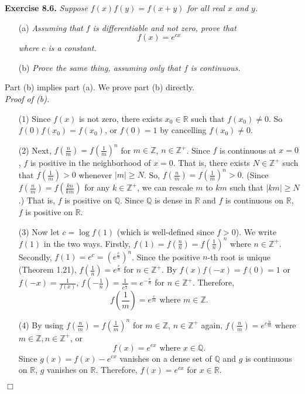 \documentclass{article}
\begin{document}



\textbf{Exercise 8.6.}
\emph{Suppose $f(x)f(y) = f(x + y)$ for all real $x$ and $y$.}
\begin{enumerate}
\item[(a)]
\emph{Assuming that $f$ is differentiable and not zero, prove that
$$f(x) = e^{cx}$$
where $c$ is a constant.}
\item[(b)]
\emph{Prove the same thing, assuming only that $f$ is continuous.} \\
\end{enumerate}

Part (b) implies part (a). We prove part (b) directly. \\

\emph{Proof of (b).}
\begin{enumerate}
\item[(1)]
Since $f(x)$ is not zero, there exists $x_0 \in \mathbb{R}$ such that $f(x_0) \neq 0$.
So $f(0)f(x_0) = f(x_0)$, or $f(0) = 1$ by cancelling $f(x_0) \neq 0$.

\item[(2)]
Next, $f(\frac{n}{m}) = f(\frac{1}{m})^n$ for $m \in \mathbb{Z}$, $n \in \mathbb{Z}^{+}$.
Since $f$ is continuous at $x = 0$, $f$ is positive in the neighborhood of $x = 0$.
That is, there exists $N \in \mathbb{Z}^{+}$ such that $f(\frac{1}{m}) > 0$
whenever $|m| \geq N$.
So, $f(\frac{n}{m}) = f(\frac{1}{m})^n > 0$.
(Since $f(\frac{n}{m}) = f(\frac{kn}{km})$ for any $k \in \mathbb{Z}^{+}$,
we can rescale $m$ to $km$ such that $|km| \geq N$.)
That is, $f$ is positive on $\mathbb{Q}$.
Since $\mathbb{Q}$ is dense in $\mathbb{R}$ and $f$ is continuous on $\mathbb{R}$,
$f$ is positive on $\mathbb{R}$.

\item[(3)]
Now let $c = \log f(1)$ (which is well-defined since $f > 0$).
We write $f(1)$ in the two ways.
Firstly, $f(1) = f(\frac{n}{n}) = f(\frac{1}{n})^n$ where $n \in \mathbb{Z}^{+}$.
Secondly, $f(1) = e^c = (e^{\frac{c}{n}})^n$.
Since the positive $n$-th root is unique (Theorem 1.21),
$f(\frac{1}{n}) = e^{\frac{c}{n}}$ for $n \in \mathbb{Z}^{+}$.
By $f(x)f(-x) = f(0) = 1$ or $f(-x) = \frac{1}{f(x)}$,
$f(-\frac{1}{n}) = \frac{1}{e^{\frac{c}{n}}} = e^{-\frac{c}{n}}$ for $n \in \mathbb{Z}^{+}$.
Therefore,
\[
  f\left( \frac{1}{m} \right) = e^{\frac{c}{m}} \text{ where } m \in \mathbb{Z}.
\]

\item[(4)]
By using
$f(\frac{n}{m}) = f(\frac{1}{m})^n$ for $m \in \mathbb{Z}$, $n \in \mathbb{Z}^{+}$ again,
$f(\frac{n}{m}) = e^{c \frac{n}{m}}$ where $m \in \mathbb{Z}, n \in \mathbb{Z}^{+}$, or
$$f(x) = e^{cx} \text{ where } x \in \mathbb{Q}.$$
Since $g(x) = f(x) - e^{cx}$ vanishes on a dense set of $\mathbb{Q}$
and $g$ is continuous on $\mathbb{R}$, $g$ vanishes on $\mathbb{R}$.
Therefore, $f(x) = e^{cx}$ for $x \in \mathbb{R}$.
\end{enumerate}
$\Box$ \\
\end{document}
